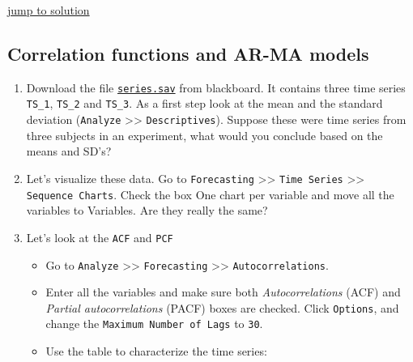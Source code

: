 \documentclass[]{book}
\providecommand{\tightlist}{%
  \setlength{\itemsep}{0pt}\setlength{\parskip}{0pt}}
\begin{document}
\protect\hyperlink{btasol}{\textbar{} jump to solution \textbar{}}

\hypertarget{pacf}{\subsection{Correlation functions and AR-MA
models}\label{pacf}}

\begin{enumerate}
\def\labelenumi{\arabic{enumi}.}
\item
  Download the file
  \href{https://github.com/FredHasselman/DCS/blob/master/assignmentData/BasicTSA_arma/series.sav}{\texttt{series.sav}}
  from blackboard. It contains three time series \texttt{TS\_1},
  \texttt{TS\_2} and \texttt{TS\_3}. As a first step look at the mean
  and the standard deviation (\texttt{Analyze}
  \textgreater{}\textgreater{} \texttt{Descriptives}). Suppose these
  were time series from three subjects in an experiment, what would you
  conclude based on the means and SD's?
\item
  Let's visualize these data. Go to \texttt{Forecasting}
  \textgreater{}\textgreater{} \texttt{Time\ Series}
  \textgreater{}\textgreater{} \texttt{Sequence\ Charts}. Check the box
  One chart per variable and move all the variables to Variables. Are
  they really the same?
\item
  Let's look at the \texttt{ACF} and \texttt{PCF}

  \begin{itemize}
  \tightlist
  \item
    Go to \texttt{Analyze} \textgreater{}\textgreater{}
    \texttt{Forecasting} \textgreater{}\textgreater{}
    \texttt{Autocorrelations}.
  \item
    Enter all the variables and make sure both \emph{Autocorrelations}
    (ACF) and \emph{Partial autocorrelations} (PACF) boxes are checked.
    Click \texttt{Options}, and change the
    \texttt{Maximum\ Number\ of\ Lags} to \texttt{30}.
  \item
    Use the table to characterize the time series:
  \end{itemize}
\end{enumerate}
\end{document}
